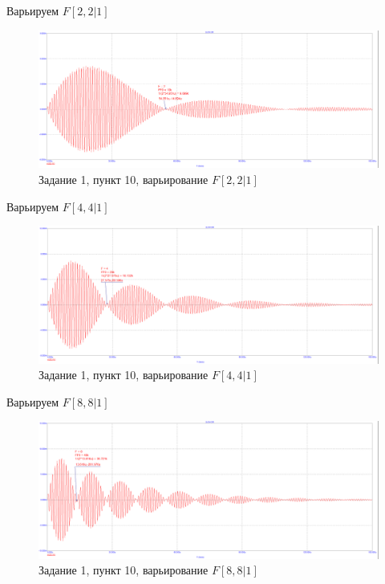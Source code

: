\documentclass[a4paper, 14pt]{extarticle}%
\begin{document}
Варьируем $F [2, 2|1]$

\begin{figure}[h!]
	\centering
			\includegraphics[width=1.1\linewidth]{908_work/10_3_f2.png}
            \caption{Задание 1,  пункт 10, варьирование $F [2, 2|1]$}
	\label{A}
\end{figure}

Варьируем  $F  [4, 4|1]$

\begin{figure}[h!]
	\centering
			\includegraphics[width=1.1\linewidth]{908_work/10_3_f4.png}
            \caption{Задание 1,  пункт 10, варьирование $F  [4, 4|1]$}
	\label{A}
\end{figure}

Варьируем $F [8, 8|1]$

\begin{figure}[h!]
	\centering
			\includegraphics[width=1.1\linewidth]{908_work/10_3_f8.png}
            \caption{Задание 1,  пункт 10, варьирование $F [8, 8|1]$}
	\label{A}
\end{figure}
\end{document}
